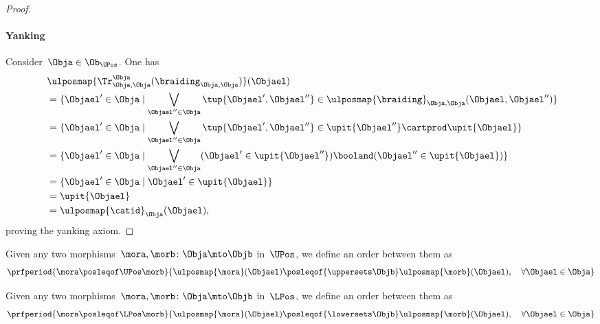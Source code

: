 \begin{proof}
    \paragraph*{Yanking}
    Consider~$\Obja\in \Ob_{\UPos}$.
    One has
    \begin{equation*}
        \begin{aligned}
            ~ & \ulposmap{\Tr_{\Obja,\Obja}^{\Obja}(\braiding_{\Obja,\Obja})}(\Objael)                                                                     \\
              & =\{ \Objael'\in \Obja \mid \bigvee_{\Objael''\in \Obja}\tup{\Objael',\Objael''}\in \ulposmap{\braiding}_{\Obja,\Obja}(\Objael,\Objael'')\} \\
              & =\{ \Objael'\in \Obja \mid \bigvee_{\Objael''\in \Obja}\tup{\Objael',\Objael''}\in \upit\{\Objael''\}\cartprod \upit\{ \Objael\}\}         \\
              & =\{ \Objael'\in \Obja \mid \bigvee_{\Objael''\in \Obja} (\Objael'\in \upit\{\Objael''\}) \booland(\Objael'' \in \upit\{ \Objael\})\}       \\
              & =\{ \Objael'\in \Obja \mid \Objael'\in \upit\{\Objael\}\}                                                                                  \\
              & =\upit \{\Objael\}                                                                                                                         \\
              & =\ulposmap{\catid}_\Obja(\Objael),
        \end{aligned}
    \end{equation*}
    proving the yanking axiom.
\end{proof}

\begin{definition}
    \label{def:upos_order}
    Given any two morphisms~$\mora,\morb\colon \Obja \mto \Objb$ in~$\UPos$, we define an order between them as
    \begin{equation*}
        \prfperiod{\mora \posleqof\UPos \morb}{\ulposmap{\mora}(\Objael)\posleqof{\uppersets \Objb} \ulposmap{\morb}(\Objael), \quad \forall \Objael \in \Obja}
    \end{equation*}
\end{definition}

\begin{definition}
    \label{def:lpos_order}
    Given any two morphisms~$\mora,\morb\colon \Obja \mto \Objb$ in~$\LPos$, we define an order between them as
    \begin{equation*}
        \prfperiod{\mora \posleqof\LPos \morb}{\ulposmap{\mora}(\Objael)\posleqof{\lowersets \Objb} \ulposmap{\morb}(\Objael), \quad \forall \Objael \in \Obja}
    \end{equation*}
\end{definition}

